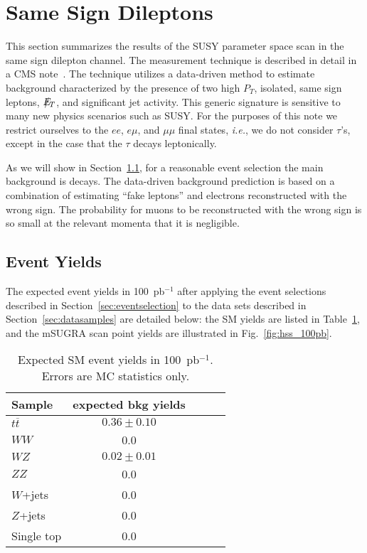 \section{Same Sign Dileptons}
\label{sec:samesign}

This section summarizes the results of the SUSY parameter space scan
in the same sign dilepton channel. The measurement technique is
described in detail in a CMS note~\cite{ssnote}. The technique
utilizes a data-driven method to estimate background characterized
by the presence of two high $P_T$, isolated, same sign leptons,
$E\!\!\!\!/_T$, and significant jet activity. This generic signature is
sensitive to many new physics scenarios such as SUSY.  For the purposes
of this note we restrict ourselves to the $ee$, $e\mu$, and $\mu\mu$
final states, {\em i.e.}, we do not consider $\tau$'s, except in the
case that the $\tau$ decays leptonically. 

As we will show in Section~\ref{sec:yields}, for a reasonable event
selection the main background is \ttbar decays. The data-driven
background prediction is based on a 
combination of estimating ``fake leptons''\cite{fakenote} and 
electrons reconstructed with the wrong sign\cite{ssnote}. The probability
for muons to be reconstructed with the wrong sign is so small at the relevant momenta
that it is negligible.

\subsection{Event Yields}
\label{sec:yields}

The expected event yields in 100~pb$^{-1}$ after applying the event selections
described in Section~\ref{sec:eventselection} to the data sets described in
Section~\ref{sec:datasamples} are detailed below: the SM yields are listed in
Table~\ref{tab:yields}, and the mSUGRA scan point yields are illustrated in
Fig.~\ref{fig:hss_100pb}.

\begin{table}[hbt]
\begin{center}
\begin{tabular}{|l|c|c|c|c|}\hline
Sample           & expected bkg yields   \\ \hline
$t\overline{t}$  &   $0.36\pm 0.10 $         \\ 
$WW$             &   0.0          \\ 
$WZ$             &   $0.02\pm 0.01$          \\ 
$ZZ$             &   0.0          \\ 
$W$+jets         &   0.0             \\
$Z$+jets         &   0.0             \\ 
Single top       &   0.0          \\ \hline
\end{tabular}
\caption{Expected SM event yields in 100~pb$^{-1}$. Errors are MC statistics only.\label{tab:yields}}
\end{center}
\end{table}

